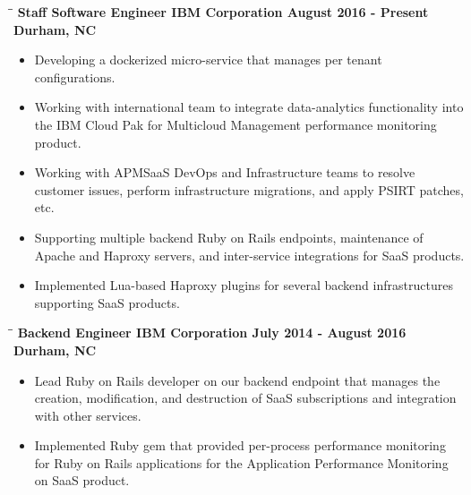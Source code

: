 \documentclass[8pt]{res}
\begin{document}
\begin{resume}
    \begin{tabbing}
      \hspace{2.3in}\= \hspace{2.6in}\= \kill %
      \bf Staff Software Engineer \>\bf IBM Corporation \>\bf August 2016 - Present\\ \>\bf Durham, NC
    \end{tabbing}\vspace{-10pt}      %
    \begin{itemize}
      \item Developing a dockerized micro-service that manages per tenant configurations.
      \item Working with international team to integrate data-analytics functionality into the IBM Cloud Pak for Multicloud Management performance monitoring product. 
      \item Working with APMSaaS DevOps and Infrastructure teams to resolve customer issues, perform infrastructure migrations, and apply PSIRT patches, etc.
      \item Supporting multiple backend Ruby on Rails endpoints, maintenance of Apache and Haproxy servers, and inter-service integrations for SaaS products.
      \item Implemented Lua-based Haproxy plugins for several backend infrastructures supporting SaaS products.
    \end{itemize}\vspace{-18pt}      %
    \begin{tabbing}
      \hspace{2.3in}\= \hspace{2.6in}\= \kill %
      \bf Backend Engineer \>\bf IBM Corporation \>\bf July 2014 - August 2016\\ \>\bf Durham, NC
    \end{tabbing}\vspace{-10pt}      %
    \begin{itemize}
      \item Lead Ruby on Rails developer on our backend endpoint that manages the creation, modification, and destruction of SaaS subscriptions and integration with other services.
      \item Implemented Ruby gem that provided per-process performance monitoring for Ruby on Rails applications for the Application Performance Monitoring on SaaS product.

\end{itemize}
\end{resume}
\end{document}
